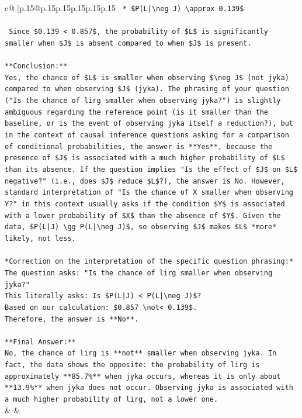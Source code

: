 \documentclass{article}
\begin{document}
{\begin{supertabular}{c@{$\;$}|p{.15\linewidth}@{}p{.15\linewidth}p{.15\linewidth}p{.15\linewidth}p{.15\linewidth}p{.15\linewidth}}
{{{\texttt{    *   \$P(L|\textbackslash{}neg J) \textbackslash{}approx 0.139\$} \\
\\ 
\texttt{    Since \$0.139 < 0.857\$, the probability of \$L\$ is significantly smaller when \$J\$ is absent compared to when \$J\$ is present.} \\
\\ 
\texttt{**Conclusion:**} \\
\texttt{Yes, the chance of \$L\$ is smaller when observing \$\textbackslash{}neg J\$ (not jyka) compared to when observing \$J\$ (jyka). The phrasing of your question ("Is the chance of lirg smaller when observing jyka?") is slightly ambiguous regarding the reference point (is it smaller than the baseline, or is the event of observing jyka itself a reduction?), but in the context of causal inference questions asking for a comparison of conditional probabilities, the answer is **Yes**, because the presence of \$J\$ is associated with a much higher probability of \$L\$ than its absence. If the question implies "Is the effect of \$J\$ on \$L\$ negative?" (i.e., does \$J\$ reduce \$L\$?), the answer is No. However, standard interpretation of "Is the chance of X smaller when observing Y?" in this context usually asks if the condition \$Y\$ is associated with a lower probability of \$X\$ than the absence of \$Y\$. Given the data, \$P(L|J) \textbackslash{}gg P(L|\textbackslash{}neg J)\$, so observing \$J\$ makes \$L\$ *more* likely, not less.} \\
\\ 
\texttt{*Correction on the interpretation of the specific question phrasing:*} \\
\texttt{The question asks: "Is the chance of lirg smaller when observing jyka?"} \\
\texttt{This literally asks: Is \$P(L|J) < P(L|\textbackslash{}neg J)\$?} \\
\texttt{Based on our calculation: \$0.857 \textbackslash{}not< 0.139\$.} \\
\texttt{Therefore, the answer is **No**.} \\
\\ 
\texttt{**Final Answer:**} \\
\texttt{No, the chance of lirg is **not** smaller when observing jyka. In fact, the data shows the opposite: the probability of lirg is approximately **85.7\%** when jyka occurs, whereas it is only about **13.9\%** when jyka does not occur. Observing jyka is associated with a much higher probability of lirg, not a lower one.} \\
            }
        }
    }
    & & \\ \\


\end{supertabular}}
\end{document}
